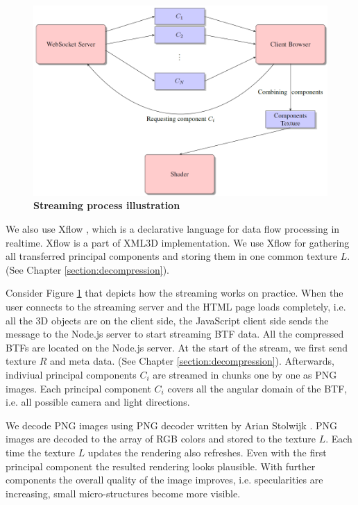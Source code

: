 \begin{figure}[h]
 \centering
 \includegraphics[width=1.0\textwidth]{figures/streaming}
 \caption[Streaming process illustration ] {
 	{\bf Streaming process illustration}
	}
 \label{fig:streaming}
\end{figure}


We also use Xflow \cite{xflow}, which is a declarative language for data flow processing in realtime.
Xflow is a part of XML3D implementation. We use Xflow for gathering all transferred principal components and storing them in one common texture $L$. (See Chapter  \ref{section:decompression}).

Consider Figure \ref{fig:streaming} that depicts how the streaming works on practice.
When the user connects to the streaming server and the HTML page loads completely, 
i.e. all the 3D objects are on the client side, the JavaScript client side sends the message to the Node.js server to start streaming BTF data.
All the compressed BTFs are located on the Node.js server.
At the start of the stream, we first send texture $R$ and meta data. (See Chapter  \ref{section:decompression}).
Afterwards, indiviual principal components $C_{i}$ are streamed in chunks one by one as PNG images.
Each principal component $C_{i}$ covers all the angular domain of the BTF, i.e. all possible camera and light directions.

We decode PNG images using PNG decoder written by Arian Stolwijk \cite{pngreader}. PNG images are decoded to the array of RGB colors and stored to the texture $L$.
Each time the texture $L$ updates the rendering also refreshes.
Even with the first principal component the resulted rendering looks plausible.
With further components the overall quality of the image improves, i.e. specularities are increasing, small micro-structures become more visible.


